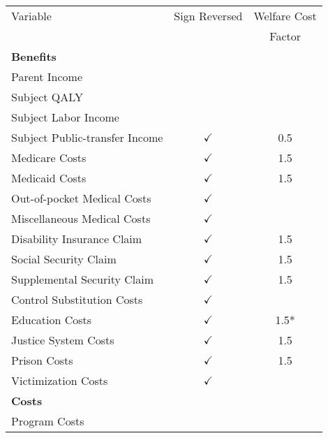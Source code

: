 \begin{tabular}{l c c}
\toprule			
Variable & Sign Reversed	& Welfare Cost \\
	&		& Factor \\
\midrule
\textbf{Benefits} 	\\			
\quad Parent Income			& \\
\quad Subject QALY			& \\
\quad Subject Labor Income	& \\
\quad Subject Public-transfer Income	& $\checkmark$	& 0.5 \\
\quad Medicare Costs			& $\checkmark$	& 1.5 \\
\quad Medicaid Costs			& $\checkmark$	& 1.5 \\
\quad Out-of-pocket Medical Costs	& $\checkmark$ \\
\quad Miscellaneous Medical Costs	& $\checkmark$ \\
\quad Disability Insurance Claim	& $\checkmark$	&	1.5 \\
\quad Social Security Claim	& $\checkmark$	&	1.5 \\
\quad Supplemental Security Claim	& $\checkmark$	&	1.5 \\
\quad Control Substitution Costs	& $\checkmark$	& \\
\quad Education Costs			& $\checkmark$	& 1.5* \\
\quad Justice System Costs	& $\checkmark$	& 1.5 \\
\quad Prison Costs			& $\checkmark$	& 1.5 \\
\quad Victimization Costs		& $\checkmark$	& \\
\textbf{Costs} 	\\			
\quad Program Costs			& \\
\bottomrule			
\end{tabular}